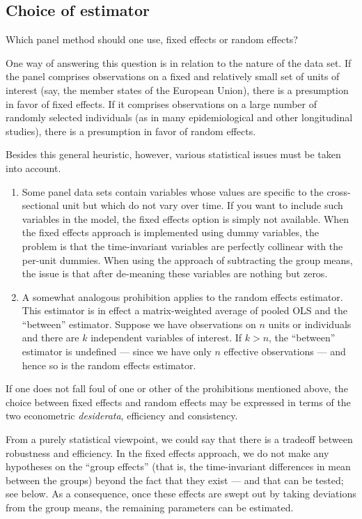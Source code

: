 \subsection{Choice of estimator}
\label{panel-choice}

Which panel method should one use, fixed effects or random effects?

One way of answering this question is in relation to the nature of the
data set.  If the panel comprises observations on a fixed and
relatively small set of units of interest (say, the member states of
the European Union), there is a presumption in favor of fixed effects.
If it comprises observations on a large number of randomly selected
individuals (as in many epidemiological and other longitudinal
studies), there is a presumption in favor of random effects.

Besides this general heuristic, however, various statistical
issues must be taken into account.

\begin{enumerate}

\item Some panel data sets contain variables whose values are specific
  to the cross-sectional unit but which do not vary over time.  If you
  want to include such variables in the model, the fixed effects
  option is simply not available.  When the fixed effects approach is
  implemented using dummy variables, the problem is that the
  time-invariant variables are perfectly collinear with the per-unit
  dummies.  When using the approach of subtracting the group means,
  the issue is that after de-meaning these variables are nothing but
  zeros.
\item A somewhat analogous prohibition applies to the random effects
  estimator.  This estimator is in effect a matrix-weighted average of
  pooled OLS and the ``between'' estimator.  Suppose we have
  observations on $n$ units or individuals and there are $k$
  independent variables of interest.  If $k>n$, the ``between''
  estimator is undefined --- since we have only $n$ effective
  observations --- and hence so is the random effects estimator.
\end{enumerate}

If one does not fall foul of one or other of the prohibitions
mentioned above, the choice between fixed effects and random effects
may be expressed in terms of the two econometric \textit{desiderata},
efficiency and consistency.  

From a purely statistical viewpoint, we could say that there is a
tradeoff between robustness and efficiency. In the fixed effects
approach, we do not make any hypotheses on the ``group effects'' (that
is, the time-invariant differences in mean between the groups) beyond
the fact that they exist --- and that can be tested; see below. As a
consequence, once these effects are swept out by taking deviations
from the group means, the remaining parameters can be estimated.

